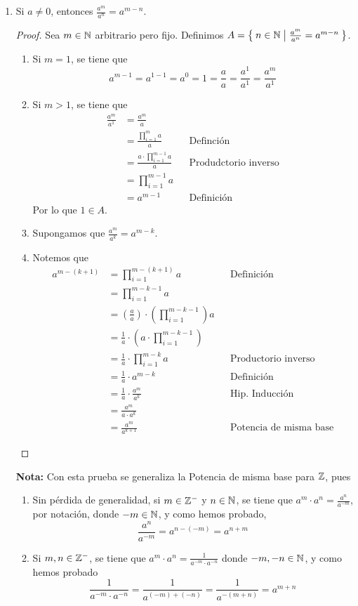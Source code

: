 \begin{enumerate}[label=\alph*)]
  \item Si $a\neq 0$, entonces $\frac{a^m}{a^n} = a^{m-n}$.
  \begin{proof}\leavevmode
    Sea $m\in \mathbb{N}$ arbitrario pero fijo. Definimos $A=\Set{n\in \mathbb{N}|\frac{a^m}{a^n} = a^{m-n}}$.
    \begin{enumerate}[label=\roman*)]
      \item Si $m=1$, se tiene que \[a^{m-1} = a^{1-1} = a^0 = 1 = \frac{a}{a} = \frac{a^1}{a^1} = \frac{a^m}{a^1}\]
      \item Si $m>1$, se tiene que 
      \begin{align*}
        \frac{a^m}{a^1} &= \frac{a^m}{a}\\
        &= \frac{\prod_{i=1}^{m} a}{a} && \text{Definción}\\
        &= \frac{a \cdot \prod_{i=1}^{m-1} a}{a} && \text{Produdctorio inverso}\\
        &= \prod_{i=1}^{m-1} a\\
        &= a^{m-1} && \text{Definición}
      \end{align*}
      Por lo que $1\in A$.
      \item Supongamos que $\frac{a^m}{a^k} = a^{m-k}$.
      \item Notemos que
      \begin{align*}
        a^{m-(k+1)} &= \prod_{i=1}^{m-(k+1)} a && \text{Definición}\\
        &= \prod_{i=1}^{m-k-1} a\\
        &= \left(\frac{a}{a}\right) \cdot \left(\prod_{i=1}^{m-k-1}\right) a\\
        &= \frac{1}{a} \cdot \left(a\cdot \prod_{i=1}^{m-k-1} \right)\\
        &= \frac{1}{a} \cdot \prod_{i=1}^{m-k} a && \text{Productorio inverso}\\
        &= \frac{1}{a} \cdot a^{m-k}&& \text{Definición}\\
        &= \frac{1}{a}\cdot \frac{a^m}{a^k} && \text{Hip. Inducción}\\
        &= \frac{a^m}{a\cdot a^k}\\
        &= \frac{a^m}{a^{k+1}} && \text{Potencia de misma base}
      \end{align*}
    \end{enumerate}
  \end{proof}
  
  \textbf{Nota:} Con esta prueba se generaliza la Potencia de misma base para $\mathbb{Z}$, pues
  \begin{enumerate}[label=\roman*)]
    \item Sin pérdida de generalidad, si $m\in \mathbb{Z}^-$ y $n\in \mathbb{N}$, se tiene que $a^m\cdot a^n = \frac{a^n}{a^{-m}}$, por notación, donde $-m\in \mathbb{N}$, y como hemos probado, \[\frac{a^n}{a^{-m}} = a^{n-(-m)} = a^{n+m}\]
    \item Si $m,n\in \mathbb{Z}^-$, se tiene que $a^m \cdot a^n = \frac{1}{a^{-m}\cdot a^{-n}}$ donde $-m, -n\in \mathbb{N}$, y como hemos probado \[\frac{1}{a^{-m}\cdot a^{-n}} = \frac{1}{a^{(-m)+(-n)}} = \frac{1}{a^{-(m+n)}} = a^{m+n}\]
  \end{enumerate}
  

\end{enumerate}
